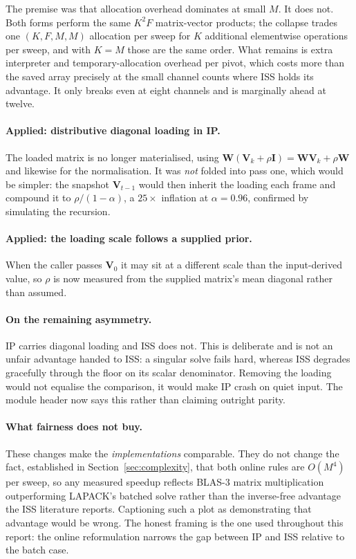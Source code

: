\documentclass[11pt,a4paper]{article}
\newcommand{\W}{\boldsymbol{W}}
\newcommand{\V}{\boldsymbol{V}}
\begin{document}
The premise was that allocation overhead dominates at small $M$. It does not.
Both forms perform the same $K^2F$ matrix-vector products; the collapse trades
one $(K,F,M,M)$ allocation per sweep for $K$ additional elementwise operations
per sweep, and with $K = M$ those are the same order. What remains is extra
interpreter and temporary-allocation overhead per pivot, which costs more than
the saved array precisely at the small channel counts where ISS holds its
advantage. It only breaks even at eight channels and is marginally ahead at
twelve.

\paragraph{Applied: distributive diagonal loading in IP.} The loaded matrix is no
longer materialised, using $\W(\V_k + \rho\boldsymbol{I}) = \W\V_k + \rho\W$ and
likewise for the normalisation. It was \emph{not} folded into pass one, which
would be simpler: the snapshot $\V_{t-1}$ would then inherit the loading each
frame and compound it to $\rho/(1-\alpha)$, a $25\times$ inflation at
$\alpha = 0.96$, confirmed by simulating the recursion.

\paragraph{Applied: the loading scale follows a supplied prior.} When the caller
passes $\V_0$ it may sit at a different scale than the input-derived value, so
$\rho$ is now measured from the supplied matrix's mean diagonal rather than
assumed.

\paragraph{On the remaining asymmetry.} IP carries diagonal loading and ISS does
not. This is deliberate and is not an unfair advantage handed to ISS: a singular
solve fails hard, whereas ISS degrades gracefully through the floor on its
scalar denominator. Removing the loading would not equalise the comparison, it
would make IP crash on quiet input. The module header now says this rather than
claiming outright parity.

\paragraph{What fairness does not buy.} These changes make the \emph{implementations}
comparable. They do not change the fact, established in
Section~\ref{sec:complexity}, that both online rules are $O(M^4)$ per sweep, so
any measured speedup reflects BLAS-3 matrix multiplication outperforming
LAPACK's batched solve rather than the inverse-free advantage the ISS literature
reports. Captioning such a plot as demonstrating that advantage would be wrong.
The honest framing is the one used throughout this report: the online
reformulation narrows the gap between IP and ISS relative to the batch case.
\end{document}
